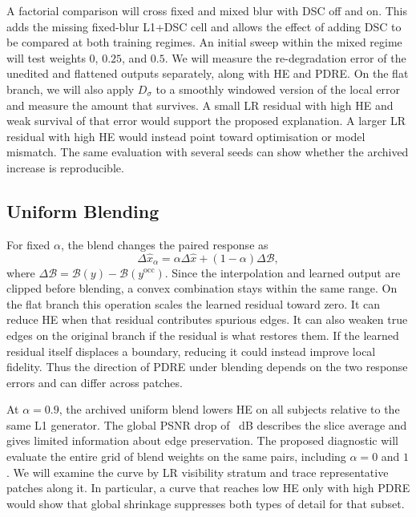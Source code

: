 \documentclass[journal]{IEEEtran}
\begin{document}
A factorial comparison will cross fixed and mixed blur with DSC off and on. This adds the missing fixed-blur L1+DSC cell and allows the effect of adding DSC to be compared at both training regimes. An initial sweep within the mixed regime will test weights $0$, $0.25$, and $0.5$. We will measure the re-degradation error of the unedited and flattened outputs separately, along with HE and PDRE. On the flat branch, we will also apply $D_\sigma$ to a smoothly windowed version of the local error and measure the amount that survives. A small LR residual with high HE and weak survival of that error would support the proposed explanation. A larger LR residual with high HE would instead point toward optimisation or model mismatch. The same evaluation with several seeds can show whether the archived increase is reproducible.

\subsection{Uniform Blending}
For fixed $\alpha$, the blend changes the paired response as
\begin{equation}
\Delta\hat{x}_\alpha =
\alpha\Delta\hat{x}+(1-\alpha)\Delta\mathcal{B},
\end{equation}
where $\Delta\mathcal{B}=\mathcal{B}(y)-\mathcal{B}(y^{\mathrm{occ}})$. Since the interpolation and learned output are clipped before blending, a convex combination stays within the same range. On the flat branch this operation scales the learned residual toward zero. It can reduce HE when that residual contributes spurious edges. It can also weaken true edges on the original branch if the residual is what restores them. If the learned residual itself displaces a boundary, reducing it could instead improve local fidelity. Thus the direction of PDRE under blending depends on the two response errors and can differ across patches.

At $\alpha=0.9$, the archived uniform blend lowers HE on all \ArchiveSubjects{} subjects relative to the same L1 generator. The global PSNR drop of \PSNRshrink{}~dB describes the slice average and gives limited information about edge preservation. The proposed diagnostic will evaluate the entire grid of blend weights on the same pairs, including $\alpha=0$ and $1$. We will examine the curve by LR visibility stratum and trace representative patches along it. In particular, a curve that reaches low HE only with high PDRE would show that global shrinkage suppresses both types of detail for that subset.
\end{document}
